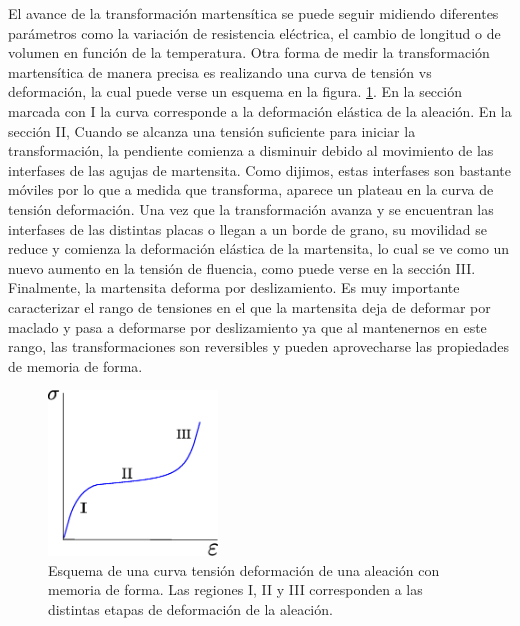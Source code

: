\documentclass[a4paper,12pt,fleqn,twoside,openany]{book}
\begin{document}
El avance de la transformación martensítica se puede seguir midiendo diferentes parámetros como la variación de resistencia eléctrica, 
el cambio de longitud o de volumen en función de la temperatura. Otra forma de medir la transformación martensítica de manera precisa es realizando 
una curva de tensión vs deformación, la cual puede verse un esquema en la figura. \ref{fig:TensDefSMA}. En la sección marcada con I la curva 
corresponde a la deformación elástica de la aleación. En la sección II, Cuando se alcanza una tensión 
suficiente para iniciar la transformación, la pendiente comienza a disminuir debido al movimiento de las interfases de las agujas de martensita. 
Como dijimos, estas interfases son bastante móviles por lo que a medida que transforma, aparece un plateau en la curva de tensión deformación. 
Una vez que la transformación avanza y se encuentran las interfases de las distintas placas o llegan a un borde de grano, su movilidad se reduce y 
comienza la deformación elástica de la martensita, lo cual se ve como un nuevo aumento en la tensión de fluencia, como puede verse en la sección III. 
Finalmente, la martensita deforma por deslizamiento. Es muy importante caracterizar el rango de tensiones en el que la martensita deja de deformar 
por maclado y pasa a 
deformarse por deslizamiento ya que al mantenernos en este rango, las transformaciones son reversibles y pueden aprovecharse las propiedades de 
memoria de forma.

\begin{figure}[h]
 \centering
 \includegraphics[width=0.4\textwidth]{SigmavsDef.eps}
 \caption{Esquema de una curva tensión deformación de una aleación con memoria de forma. Las regiones I, II y III corresponden a las distintas etapas 
 de deformación de la aleación.}
 \label{fig:TensDefSMA}
 \end{figure}
\end{document}
